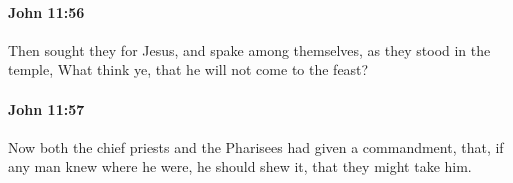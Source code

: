 		\paragraph{John 11:56} %
			\label{JOHN-11-56}

			Then sought they for Jesus, and spake among themselves, as they stood in the temple, What think ye, that he will not come to the feast?

			\begin{framed}
				\scriptsize
				\begin{compactdesc}
					\item[SBLG] 
				\end{compactdesc}
			\end{framed}

		\paragraph{John 11:57} %
			\label{JOHN-11-57}

			Now both the chief priests and the Pharisees had given a commandment, that, if any man knew where he were, he should shew it, that they might take him.

